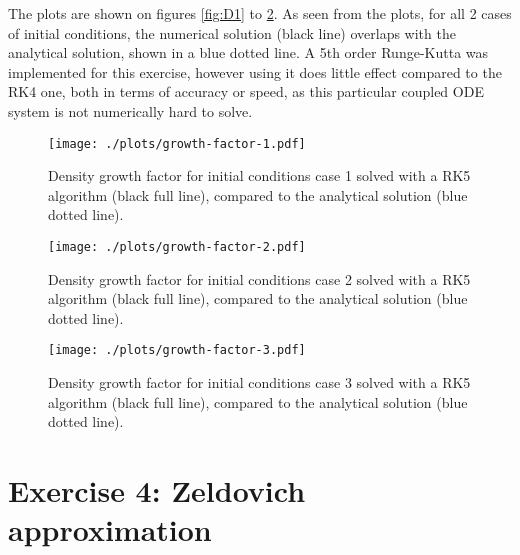 \documentclass{article}
\begin{document}
The plots are shown on figures  \ref{fig:D1} to \ref{fig:D3}. As seen from the plots, for all 2 cases of initial conditions, the numerical solution (black line) overlaps with the analytical solution, shown in a blue dotted line. A 5th order Runge-Kutta was implemented for this exercise, however using it does little effect compared to the RK4 one, both in terms of accuracy or speed, as this particular coupled ODE system is not numerically hard to solve.
\begin{figure}[!h]
\centering
\begin{minipage}[t]{7.8cm}
    \centering
    \texttt{[image: ./plots/growth-factor-1.pdf]}
    \caption{Density growth factor for initial conditions case 1 solved with a RK5 algorithm (black full line), compared to the analytical solution (blue dotted line).}
    \label{fig:D1}
\end{minipage}
\qquad
\begin{minipage}[t]{7.8cm}
    \centering
    \texttt{[image: ./plots/growth-factor-2.pdf]}
    \caption{Density growth factor for initial conditions case 2 solved with a RK5 algorithm (black full line), compared to the analytical solution (blue dotted line).}
    \label{fig:D2}
\end{minipage}
\end{figure}
\begin{figure}[!h]
    \centering
    \texttt{[image: ./plots/growth-factor-3.pdf]}
    \caption{Density growth factor for initial conditions case 3 solved with a RK5 algorithm (black full line), compared to the analytical solution (blue dotted line).}
    \label{fig:D3}
\end{figure}

\section{Exercise 4: Zeldovich approximation}
\end{document}

